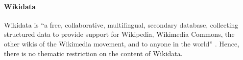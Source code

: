 %
%

\paragraph{Wikidata}

Wikidata \autocite{Wikidata} is \enquote{a free, collaborative, multilingual, secondary database, collecting structured data to provide support for Wikipedia, Wikimedia Commons, the other wikis of the Wikimedia movement, and to anyone in the world} \autocite{Wikidata_intro}. Hence, there is no thematic restriction
on the content of Wikidata.

